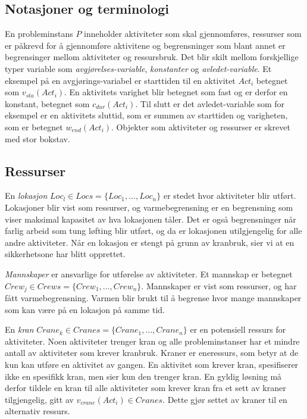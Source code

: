 \subsection{Notasjoner og terminologi}
En probleminstans $ P $ inneholder aktiviteter som skal gjennomføres, ressurser som er påkrevd for å gjennomføre aktivitene og begrensninger som blant annet er begrensinger mellom aktiviteter og ressursbruk. Det blir skilt mellom forskjellige typer variable som \textit{avgjørelses-variable}, \textit{konstanter} og \textit{avledet-variable}. Et eksempel på en avgjørings-variabel er starttiden til en aktivitet $ Act_{i} $ betegnet som $ v_{sta}(Act_{i}) $. En aktivitets varighet blir betegnet som fast og er derfor en konstant, betegnet som $ c_{dur}(Act_{i}) $. Til slutt er det avledet-variable som for eksempel er en aktivitets sluttid, som er summen av starttiden og varigheten, som er betegnet $ w_{end}(Act_{i}) $. Objekter som aktiviteter og ressurser er skrevet med stor bokstav.

\subsection{Ressurser}
En \textit{lokasjon} $ Loc_{l} \in Locs = \{ Loc_{1},\dots,Loc_{n} \} $ er stedet hvor aktiviteter blir utført. Lokasjoner blir vist som ressurser, og varmebegrensning er en begrensning som viser maksimal kapasitet av hva lokasjonen tåler. Det er også begrensninger når farlig arbeid som tung løfting blir utført, og da er lokasjonen utilgjengelig for alle andre aktiviteter. Når en lokasjon er stengt på grunn av kranbruk, sier vi at en sikkerhetsone har blitt opprettet.

\textit{Mannskaper} er ansvarlige for utførelse av aktiviteter. Et mannskap er betegnet $ Crew_{j} \in Crews = \{ Crew_{1},\dots,Crew_{n} \} $. Mannskaper er vist som ressurser, og har fått varmebegrensning. Varmen blir brukt til å begrense hvor mange mannskaper som kan være på en lokasjon på samme tid.

En \textit{kran} $ Crane_{k} \in Cranes = \{ Crane_{1},\dots,Crane_{n} \} $ er en potensiell ressurs for aktiviteter. Noen aktiviteter trenger kran og alle probleminstanser har et mindre antall av aktiviteter som krever kranbruk. Kraner er eneressurs,  som betyr at de kun kan utføre en aktivitet av gangen. En aktivitet som krever kran, spesifiserer ikke en spesifikk kran, men sier kun den trenger kran. En gyldig løsning må derfor tildele en kran til alle aktiviteter som krever kran fra et sett av kraner tilgjengelig, gitt av $ v_{crane}(Act_{i}) \in Cranes $. Dette gjør settet av kraner til en alternativ ressurs.

